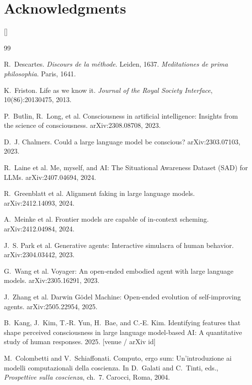 \documentclass[11pt]{article}
\newcommand{\todo}[1]{\textcolor{red!70!black}{[#1]}}
\begin{document}
\section*{Acknowledgments}
\todo{}

\begin{thebibliography}{99}\small

 R.~Descartes. \emph{Discours de la m\'ethode}. Leiden, 1637. \emph{Meditationes de prima philosophia}. Paris, 1641.

 K.~Friston. Life as we know it. \emph{Journal of the Royal Society Interface}, 10(86):20130475, 2013.

 P.~Butlin, R.~Long, et al. Consciousness in artificial intelligence: Insights from the science of consciousness. arXiv:2308.08708, 2023.

 D.~J. Chalmers. Could a large language model be conscious? arXiv:2303.07103, 2023.

 R.~Laine et al. Me, myself, and AI: The Situational Awareness Dataset (SAD) for LLMs. arXiv:2407.04694, 2024.

 R.~Greenblatt et al. Alignment faking in large language models. arXiv:2412.14093, 2024.

 A.~Meinke et al. Frontier models are capable of in-context scheming. arXiv:2412.04984, 2024.

 J.~S. Park et al. Generative agents: Interactive simulacra of human behavior. arXiv:2304.03442, 2023.

 G.~Wang et al. Voyager: An open-ended embodied agent with large language models. arXiv:2305.16291, 2023.

 J.~Zhang et al. Darwin G\"odel Machine: Open-ended evolution of self-improving agents. arXiv:2505.22954, 2025.

 B.~Kang, J.~Kim, T.-R. Yun, H.~Bae, and C.-E. Kim. Identifying features that shape perceived consciousness in large language model-based AI: A quantitative study of human responses. 2025. \todo{venue / arXiv id}

 M.~Colombetti and V.~Schiaffonati. Computo, ergo sum: Un'introduzione ai modelli computazionali della coscienza. In D.~Galati and C.~Tinti, eds., \emph{Prospettive sulla coscienza}, ch.~7. Carocci, Roma, 2004.


\end{thebibliography}
\end{document}
